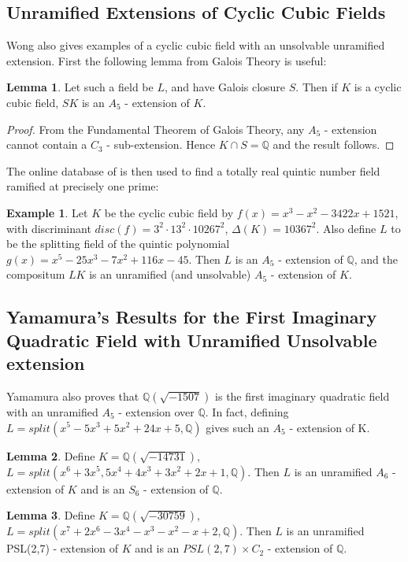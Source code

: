 \documentclass[12pt]{extarticle}
\newcommand{\Q}{\mathbb{Q}}
\newcommand{\<}{\langle}
\renewcommand{\>}{\rangle}
\theoremstyle{definition}
\newtheorem{example}{Example}
\newtheorem{lemma}{Lemma}
\begin{document}
\subsection{Unramified Extensions of Cyclic Cubic Fields}
Wong \cite{WONG} also gives examples of a cyclic cubic field with an unsolvable unramified extension.
First the following lemma from Galois Theory is useful:

\begin{lemma}
 Let such a field be $L$, and have Galois closure $S$. Then if $K$ is a cyclic cubic field, $SK$ is an $A_5$ - extension of $K$.
\end{lemma}
\begin{proof}
From the Fundamental Theorem of Galois Theory, any $A_5$ - extension cannot contain a $C_3$ - sub-extension. Hence $K \cap S = \Q$ and the result follows.
\end{proof}


The online database of \cite{JONE2} is then used to find a totally real quintic number field ramified at precisely one prime: 


\begin{example}
Let $K$ be the cyclic cubic field by $f(x) = x^3 - x^2 - 3422x + 1521$, with discriminant $disc(f) = 3^2 \cdot 13^2 \cdot 10267^2$, $\Delta(K) = 10367^2$. Also define $L$ to be the splitting field of the quintic polynomial $g(x) = x^5 - 25x^3 - 7x^2 + 116x - 45$. Then $L$ is an $A_5$ - extension of $\Q$, and the compositum $LK$ is an unramified (and unsolvable) $A_5$ - extension of $K$.
\end{example}




\subsection{Yamamura's Results for the First Imaginary Quadratic Field with Unramified Unsolvable extension}


Yamamura \cite{YAMA1997} also proves that $\Q(\sqrt{-1507})$ is the first imaginary quadratic field with an unramified $A_5$ - extension over $\Q$. In fact, defining $L=split\left( x^5-5x^3+5x^2+24x+5,\Q\right)$ gives such an $A_5$ - extension of K. 
\begin{lemma}
Define $K=\Q(\sqrt{-14731})$, $L=split(x^6+3x^5,5x^4+4x^3+3x^2+2x+1,\Q)$. Then $L$ is an unramified $A_6$ - extension of $K$ and is an $S_6$ - extension of $\Q$.
\end{lemma}
\begin{lemma}
Define $K=\Q(\sqrt{-30759})$, $L=split(x^7+2x^6-3x^4-x^3-x^2-x+2,\Q)$. Then $L$ is an unramified PSL(2,7) - extension of $K$ and is an $PSL(2,7)\times C_2$ - extension of $\Q$.
\end{lemma}
\end{document}
